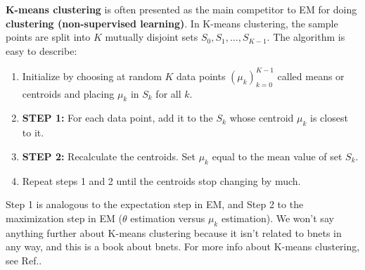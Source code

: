 {\bf K-means clustering} is often
presented as the main competitor
to EM for doing 
{\bf clustering (non-supervised
learning)}. In K-means clustering,
the sample points are 
split into $K$
mutually
disjoint sets $S_0, S_1, \ldots, S_{K-1}$. 
The algorithm is easy
to describe:
\begin{enumerate}
\item
Initialize by 
choosing  at random
$K$ data points $(\mu_k)_{k=0}^{K-1}$
called means or centroids
and placing $\mu_k$ in $S_k$
for all $k$.
 \item {\bf STEP 1:}
For each data point,
add it to the $S_k$
whose centroid $\mu_k$
is closest to it.
\item {\bf STEP 2:}
Recalculate the centroids.
Set $\mu_k$ equal to the mean value of set
$S_k$.
\item Repeat steps 1 and 2 until the
centroids stop changing 
by much.
\end{enumerate}
Step 1 is analogous
to the expectation step in EM,
and Step 2 to the maximization
step in EM ($\theta$
estimation versus 
$\mu_k$ estimation).
We won't say anything further
about K-means clustering because
it
isn't related to bnets in any 
way, and this is a book about bnets.
For more info about
K-means clustering, 
see Ref.\cite{wiki-k-means}.

